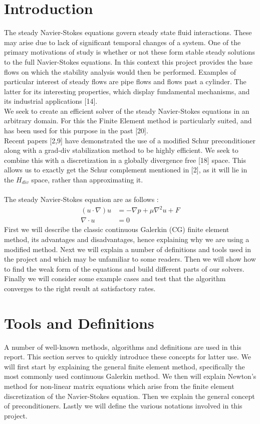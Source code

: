 \documentclass[11pt,twoside,a4paper]{article}
\begin{document}
\section{Introduction}
The steady Navier-Stokes equations govern steady state fluid interactions. These may arise due to lack of significant temporal changes of a system. One of the primary motivations of study is whether or not these form stable steady solutions to the full Navier-Stokes equations. In this context this project provides the base flows on which the stability analysis would then be performed. Examples of particular interest of steady flows are pipe flows and flows past a cylinder. The latter for its interesting properties, which display fundamental mechanisms, and its industrial applications [14].\\
We seek to create an efficient solver of the steady Navier-Stokes equations in an arbitrary domain. For this the Finite Element method is particularly suited, and has been used for this purpose in the past [20]. \\
Recent papers [2,9] have demonstrated the use of a modified Schur preconditioner along with a grad-div stabilization method to be highly efficient. We seek to combine this with a discretization in a globally divergence free [18] space. This allows us to exactly get the Schur complement mentioned in [2], as it will lie in the $H_{div}$ space, rather than approximating it.\\
\\
The steady Navier-Stokes equation are as follows :
\begin{align}
(u \cdot \nabla) u &= -\nabla p + \mu \nabla^2 u + F \\
\nabla \cdot u &= 0
\end{align}
First we will describe the classic continuous Galerkin (CG) finite element method, its advantages and disadvantages, hence explaining why we are using a modified method. Next we will explain a number of definitions and tools used in the project and which may be unfamiliar to some readers. Then we will show how to find the weak form of the equations and build different parts of our solvers. Finally we will consider some example cases and test that the algorithm converges to the right result at satisfactory rates.\\

\section{Tools and Definitions}
A number of well-known methods, algorithms and definitions are used in this report. This section serves to quickly introduce these concepts for latter use. We will first start by explaining the general finite element method, specifically the most commonly used continuous Galerkin method. We then will explain Newton's method for non-linear matrix equations which arise from the finite element discretization of the Navier-Stokes equation. Then we explain the general concept of preconditioners. Lastly we will define the various notations involved in this project.
\end{document}
